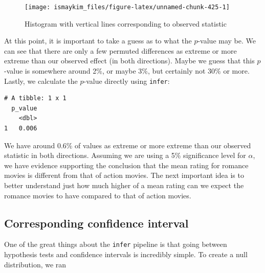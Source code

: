 \documentclass[12pt, krantz2,]{krantz}
\makeatletter
\newenvironment{Shaded}{\begin{snugshade}}{\end{snugshade}}
\newcommand{\DataTypeTok}[1]{\textcolor[rgb]{0.27,0.27,0.27}{#1}}
\newcommand{\KeywordTok}[1]{\textcolor[rgb]{0.27,0.27,0.27}{\textbf{#1}}}
\newcommand{\NormalTok}[1]{#1}
\newcommand{\OperatorTok}[1]{\textcolor[rgb]{0.43,0.43,0.43}{\textbf{#1}}}
\newcommand{\StringTok}[1]{\textcolor[rgb]{0.5,0.5,0.5}{#1}}
\newenvironment{kframe}{%
\medskip{}
\setlength{\fboxsep}{.8em}
 \def\at@end@of@kframe{}%
 \ifinner\ifhmode%
  \def\at@end@of@kframe{\end{minipage}}%
  \begin{minipage}{\columnwidth}%
 \fi\fi%
 \def\FrameCommand##1{\hskip\@totalleftmargin \hskip-\fboxsep
 \colorbox{shadecolor}{##1}\hskip-\fboxsep
     \hskip-\linewidth \hskip-\@totalleftmargin \hskip\columnwidth}%
 \MakeFramed {\advance\hsize-\width
   \@totalleftmargin\z@ \linewidth\hsize
   \@setminipage}}%
 {\par\unskip\endMakeFramed%
 \at@end@of@kframe}
\renewenvironment{Shaded}{\begin{kframe}}{\end{kframe}}
\makeatother
\begin{document}
\begin{figure}

{\centering \texttt{[image: ismaykim\_files/figure-latex/unnamed-chunk-425-1]} 

}

\caption{Histogram with vertical lines corresponding to observed statistic}\label{fig:unnamed-chunk-425}
\end{figure}

At this point, it is important to take a guess as to what the \(p\)-value may be. We can see that there are only a few permuted differences as extreme or more extreme than our observed effect (in both directions). Maybe we guess that this \(p\)-value is somewhere around 2\%, or maybe 3\%, but certainly not 30\% or more. Lastly, we calculate the \(p\)-value directly using \texttt{infer}:

\begin{Shaded}
\end{Shaded}

\begin{verbatim}
# A tibble: 1 x 1
  p_value
    <dbl>
1   0.006
\end{verbatim}

We have around 0.6\% of values as extreme or more extreme than our observed statistic in both directions. Assuming we are using a 5\% significance level for \(\alpha\), we have evidence supporting the conclusion that the mean rating for romance movies is different from that of action movies. The next important idea is to better understand just how much higher of a mean rating can we expect the romance movies to have compared to that of action movies.

\hypertarget{corresponding-confidence-interval-1}{%
\subsection{Corresponding confidence interval}\label{corresponding-confidence-interval-1}}

One of the great things about the \texttt{infer} pipeline is that going between hypothesis tests and confidence intervals is incredibly simple. To create a null distribution, we ran
\end{document}
